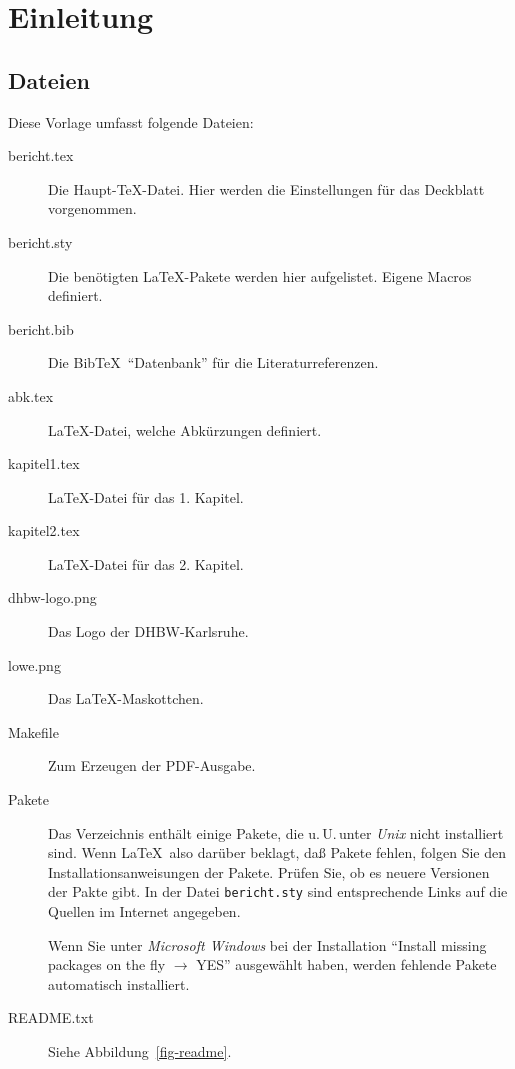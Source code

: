 
\chapter{Einleitung}

\section{Dateien}
Diese Vorlage umfasst folgende Dateien:
\begin{description}
\item[bericht.tex] Die Haupt-\TeX-Datei. Hier werden die Einstellungen für das
     Deckblatt vorgenommen.
\item[bericht.sty] Die benötigten \LaTeX-Pakete werden hier aufgelistet. Eigene Macros definiert.
\item[bericht.bib] Die Bib\TeX\ "`Datenbank"' für die Literaturreferenzen.
\item[abk.tex] \LaTeX-Datei, welche Abkürzungen definiert.
\item[kapitel1.tex] \LaTeX-Datei für das 1. Kapitel.
\item[kapitel2.tex] \LaTeX-Datei für das 2. Kapitel.
\item[dhbw-logo.png] Das Logo der DHBW-Karlsruhe.
\item[lowe.png] Das \LaTeX-Maskottchen.
\item[Makefile] Zum Erzeugen der PDF-Ausgabe.
\item[Pakete] Das Verzeichnis enthält einige Pakete, die u.\,U.\,unter \emph{Unix} nicht installiert
     sind. Wenn \LaTeX\ also darüber beklagt, daß Pakete fehlen, folgen Sie den Installationsanweisungen
     der Pakete. Prüfen Sie, ob es neuere Versionen der Pakte gibt. In der Datei
     \texttt{bericht.sty} sind entsprechende Links auf die Quellen im Internet angegeben.

     Wenn Sie unter \emph{Microsoft Windows} bei der Installation
     \enquote{Install missing packages on the fly $\longrightarrow$ YES} ausgewählt haben,
     werden fehlende Pakete automatisch installiert.
\item[README.txt] Siehe Abbildung~\ref{fig-readme}.
\end{description}

